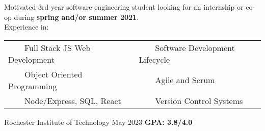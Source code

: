 \documentclass{awesome-cv}
\newcommand{\tabitem}{~~\llap{\textbullet}~~}
\begin{document}
	\makecvheader[C]

	\makecvfooter
		{}
		{}
		{}

		\vspace{-0.1cm}
		
		Motivated 3rd year software engineering student looking for an internship or co-op during \textbf{spring and/or summer 2021}. \\ Experience in:
		
		\vspace{-0.1cm}
		\begin{center}
		\begin{tabular}{l@{\hskip 2cm}l}
		\tabitem Full Stack JS Web Development & \tabitem Software Development Lifecycle \\
		\tabitem Object Oriented Programming & \tabitem Agile and Scrum \\
		\tabitem Node/Express, SQL, React & \tabitem Version Control Systems
		\end{tabular}





		\end{center}
		\vspace{-0.25cm}
	
		\vspace{-0.15cm}
		\begin{cventries}
			\cventryB
				{}
				{Rochester Institute of Technology\small{\textnormal{\color{graytext}{\enskip B.S. Software Engineering}}}}
				{May 2023}
				{}
                		{\textbf{GPA: 3.8/4.0}}
		\end{cventries}
		
\end{document}
